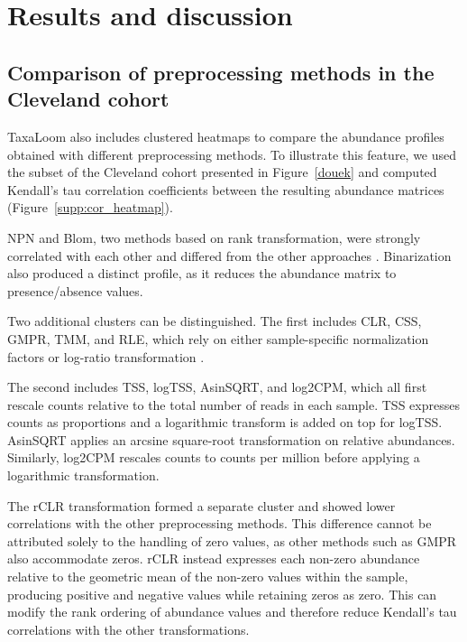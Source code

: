 \documentclass[pdflatex,sn-vancouver-num]{sn-jnl}%
\theoremstyle{thmstyleone}%
\theoremstyle{thmstyletwo}%
\theoremstyle{thmstylethree}%
\begin{document}
\section{Results and discussion}\label{sec3}

\subsection{Comparison of preprocessing methods in the Cleveland cohort}

TaxaLoom also includes clustered heatmaps to compare the abundance profiles obtained with different preprocessing methods. To illustrate this feature, we used the subset of the Cleveland cohort presented in Figure~\ref{douek} and computed Kendall's tau correlation coefficients between the resulting abundance matrices (Figure~\ref{supp:cor_heatmap}).

NPN and Blom, two methods based on rank transformation, were strongly correlated with each other and differed from the other approaches \citep{liu_nonparanormal_2009, blom_statistical_1958}. Binarization also produced a distinct profile, as it reduces the abundance matrix to presence/absence values.

Two additional clusters can be distinguished. The first includes CLR, CSS, GMPR, TMM, and RLE, which rely on either sample-specific normalization factors or log-ratio transformation \citep{aitchison_statistical_1982,paulson_differential_2013,chen_gmpr_2018, robinson_scaling_2010,anders_differential_2010}. 

The second includes TSS, logTSS, AsinSQRT, and log2CPM, which all first rescale counts relative to the total number of reads in each sample. TSS expresses counts as proportions and a logarithmic transform is added on top for logTSS. AsinSQRT applies an arcsine square-root transformation on relative abundances. Similarly, log2CPM rescales counts to counts per million before applying a logarithmic transformation. 

The rCLR \citep{martino_novel_2019} transformation formed a separate cluster and showed lower correlations with the other preprocessing methods. This difference cannot be attributed solely to the handling of zero values, as other methods such as GMPR also accommodate zeros. rCLR instead expresses each non-zero abundance relative to the geometric mean of the non-zero values within the sample, producing positive and negative values while retaining zeros as zero. This can modify the rank ordering of abundance values and therefore reduce Kendall's tau correlations with the other transformations.
\end{document}
